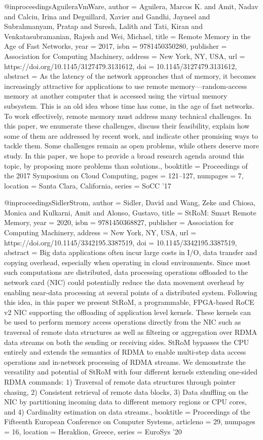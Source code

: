 {@inproceedings{AguileraVmWare,
author = {Aguilera, Marcos K. and Amit, Nadav and Calciu, Irina and Deguillard, Xavier and Gandhi, Jayneel and Subrahmanyam, Pratap and Suresh, Lalith and Tati, Kiran and Venkatasubramanian, Rajesh and Wei, Michael},
title = {Remote Memory in the Age of Fast Networks},
year = {2017},
isbn = {9781450350280},
publisher = {Association for Computing Machinery},
address = {New York, NY, USA},
url = {https://doi.org/10.1145/3127479.3131612},
doi = {10.1145/3127479.3131612},
abstract = {As the latency of the network approaches that of memory, it becomes increasingly attractive for applications to use remote memory---random-access memory at another computer that is accessed using the virtual memory subsystem. This is an old idea whose time has come, in the age of fast networks. To work effectively, remote memory must address many technical challenges. In this paper, we enumerate these challenges, discuss their feasibility, explain how some of them are addressed by recent work, and indicate other promising ways to tackle them. Some challenges remain as open problems, while others deserve more study. In this paper, we hope to provide a broad research agenda around this topic, by proposing more problems than solutions.},
booktitle = {Proceedings of the 2017 Symposium on Cloud Computing},
pages = {121–127},
numpages = {7},
location = {Santa Clara, California},
series = {SoCC '17}
}

@inproceedings{SidlerStrom,
author = {Sidler, David and Wang, Zeke and Chiosa, Monica and Kulkarni, Amit and Alonso, Gustavo},
title = {StRoM: Smart Remote Memory},
year = {2020},
isbn = {9781450368827},
publisher = {Association for Computing Machinery},
address = {New York, NY, USA},
url = {https://doi.org/10.1145/3342195.3387519},
doi = {10.1145/3342195.3387519},
abstract = {Big data applications often incur large costs in I/O, data transfer and copying overhead, especially when operating in cloud environments. Since most such computations are distributed, data processing operations offloaded to the network card (NIC) could potentially reduce the data movement overhead by enabling near-data processing at several points of a distributed system. Following this idea, in this paper we present StRoM, a programmable, FPGA-based RoCE v2 NIC supporting the offloading of application level kernels. These kernels can be used to perform memory access operations directly from the NIC such as traversal of remote data structures as well as filtering or aggregation over RDMA data streams on both the sending or receiving sides. StRoM bypasses the CPU entirely and extends the semantics of RDMA to enable multi-step data access operations and in-network processing of RDMA streams. We demonstrate the versatility and potential of StRoM with four different kernels extending one-sided RDMA commands: 1) Traversal of remote data structures through pointer chasing, 2) Consistent retrieval of remote data blocks, 3) Data shuffling on the NIC by partitioning incoming data to different memory regions or CPU cores, and 4) Cardinality estimation on data streams.},
booktitle = {Proceedings of the Fifteenth European Conference on Computer Systems},
articleno = {29},
numpages = {16},
location = {Heraklion, Greece},
series = {EuroSys '20}
}

}
